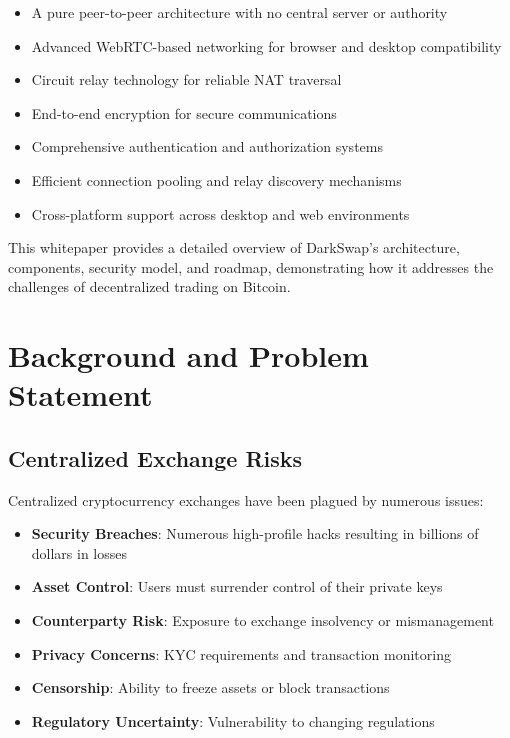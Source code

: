 \documentclass[11pt,a4paper]{article}
\begin{document}
\begin{itemize}
    \item A pure peer-to-peer architecture with no central server or authority
    \item Advanced WebRTC-based networking for browser and desktop compatibility
    \item Circuit relay technology for reliable NAT traversal
    \item End-to-end encryption for secure communications
    \item Comprehensive authentication and authorization systems
    \item Efficient connection pooling and relay discovery mechanisms
    \item Cross-platform support across desktop and web environments
\end{itemize}

This whitepaper provides a detailed overview of DarkSwap's architecture, components, security model, and roadmap, demonstrating how it addresses the challenges of decentralized trading on Bitcoin.

\section{Background and Problem Statement}

\subsection{Centralized Exchange Risks}

Centralized cryptocurrency exchanges have been plagued by numerous issues:

\begin{itemize}
    \item \textbf{Security Breaches}: Numerous high-profile hacks resulting in billions of dollars in losses
    \item \textbf{Asset Control}: Users must surrender control of their private keys
    \item \textbf{Counterparty Risk}: Exposure to exchange insolvency or mismanagement
    \item \textbf{Privacy Concerns}: KYC requirements and transaction monitoring
    \item \textbf{Censorship}: Ability to freeze assets or block transactions
    \item \textbf{Regulatory Uncertainty}: Vulnerability to changing regulations
\end{itemize}
\end{document}
